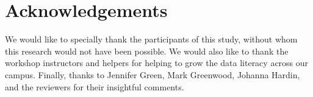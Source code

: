 \documentclass[12pt]{article}
\begin{document}

\section{Acknowledgements}

\noindent We would like to specially thank the participants of this study,
without whom this research would not have been possible. We would also like to
thank the workshop instructors and helpers for helping to grow the data
literacy across our campus. Finally, thanks to Jennifer Green, Mark Greenwood,
Johanna Hardin, and the reviewers for their insightful comments.  



\end{document}
